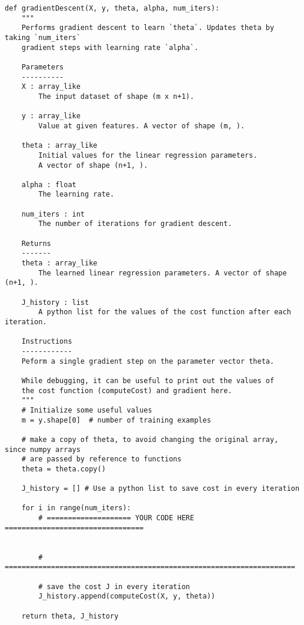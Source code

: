 \documentclass[11pt]{article}
\begin{document}
\begin{verbatim}
def gradientDescent(X, y, theta, alpha, num_iters):
    """
    Performs gradient descent to learn `theta`. Updates theta by taking `num_iters`
    gradient steps with learning rate `alpha`.

    Parameters
    ----------
    X : array_like
        The input dataset of shape (m x n+1).

    y : array_like
        Value at given features. A vector of shape (m, ).

    theta : array_like
        Initial values for the linear regression parameters.
        A vector of shape (n+1, ).

    alpha : float
        The learning rate.

    num_iters : int
        The number of iterations for gradient descent.

    Returns
    -------
    theta : array_like
        The learned linear regression parameters. A vector of shape (n+1, ).

    J_history : list
        A python list for the values of the cost function after each iteration.

    Instructions
    ------------
    Peform a single gradient step on the parameter vector theta.

    While debugging, it can be useful to print out the values of
    the cost function (computeCost) and gradient here.
    """
    # Initialize some useful values
    m = y.shape[0]  # number of training examples

    # make a copy of theta, to avoid changing the original array, since numpy arrays
    # are passed by reference to functions
    theta = theta.copy()

    J_history = [] # Use a python list to save cost in every iteration

    for i in range(num_iters):
        # ==================== YOUR CODE HERE =================================


        # =====================================================================

        # save the cost J in every iteration
        J_history.append(computeCost(X, y, theta))

    return theta, J_history

\end{verbatim}
\end{document}
